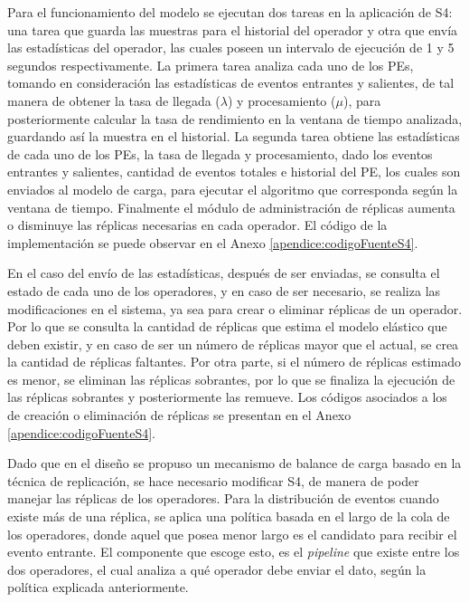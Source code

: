 Para el funcionamiento del modelo se ejecutan dos tareas en la aplicación de S4: una tarea que guarda las muestras para el historial del operador y otra que envía las estadísticas del operador, las cuales poseen un intervalo de ejecución de 1 y 5 segundos respectivamente. La primera tarea analiza cada uno de los PEs, tomando en consideración las estadísticas de eventos entrantes y salientes, de tal manera de obtener la tasa de llegada ($\lambda$) y procesamiento ($\mu$), para posteriormente calcular la tasa de rendimiento en la ventana de tiempo analizada, guardando así la muestra en el historial. La segunda tarea obtiene las estadísticas de cada uno de los PEs, la tasa de llegada y procesamiento, dado los eventos entrantes y salientes, cantidad de eventos totales e historial del PE, los cuales son enviados al modelo de carga, para ejecutar el algoritmo que corresponda según la ventana de tiempo. Finalmente el módulo de administración de réplicas aumenta o disminuye las réplicas necesarias en cada operador. El código de la implementación se puede observar en el Anexo \ref{apendice:codigoFuenteS4}.

En el caso del envío de las estadísticas, después de ser enviadas, se consulta el estado de cada uno de los operadores, y en caso de ser necesario, se realiza las modificaciones en el sistema, ya sea para crear o eliminar réplicas de un operador. Por lo que se consulta la cantidad de réplicas que estima el modelo elástico que deben existir, y en caso de ser un número de réplicas mayor que el actual, se crea la cantidad de réplicas faltantes. Por otra parte, si el número de réplicas estimado es menor, se eliminan las réplicas sobrantes, por lo que se finaliza la ejecución de las réplicas sobrantes y posteriormente las remueve. Los códigos asociados a los de creación o eliminación de réplicas se presentan en el Anexo \ref{apendice:codigoFuenteS4}.

Dado que en el diseño se propuso un mecanismo de balance de carga basado en la técnica de replicación, se hace necesario modificar S4, de manera de poder manejar las réplicas de los operadores. Para la distribución de eventos cuando existe más de una réplica, se aplica una política basada en el largo de la cola de los operadores, donde aquel que posea menor largo es el candidato para recibir el evento entrante. \normalsize{El componente que escoge esto, es el \textit{pipeline} que existe entre los dos operadores, el cual analiza a qué operador debe enviar el dato, según la política explicada anteriormente.}


